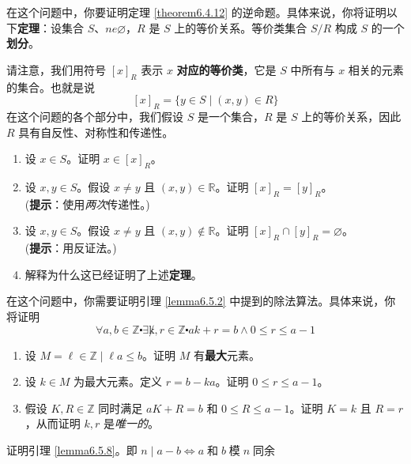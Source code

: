\begin{exercise}
    在这个问题中，你要证明定理 \ref{theorem6.4.12} 的逆命题。具体来说，你将证明以下\textbf{定理}：设集合 $S 、ne \varnothing$，$R$ 是 $S$ 上的等价关系。等价类集合 $S/R$ 构成 $S$ 的一个\textbf{划分}。

    请注意，我们用符号 $[x]_R$ 表示 $x$ \textbf{对应的等价类}，它是 $S$ 中所有与 $x$ 相关的元素的集合。也就是说
    \[[x]_R = \{y \in S \mid (x, y) \in R\}\]
    在这个问题的各个部分中，我们假设 $S$ 是一个集合，$R$ 是 $S$ 上的等价关系，因此 $R$ 具有自反性、对称性和传递性。
    \begin{enumerate}[label=(\alph*)]
        \item 设 $x \in S$。证明 $x \in [x]_R$。
        \item 设 $x, y \in S$。假设 $x \ne y$ 且 $(x, y) \in \mathbb{R}$。证明 $[x]_R = [y]_R$。\\
            (\textbf{提示}：使用\emph{两次}传递性。)
        \item 设 $x, y \in S$。假设 $x \ne y$ 且 $(x, y) \notin \mathbb{R}$。证明 $[x]_R \cap [y]_R = \varnothing$。\\
            (\textbf{提示}：用反证法。)
        \item 解释为什么这已经证明了上述\textbf{定理}。
    \end{enumerate}
\end{exercise}

\begin{exercise}\label{exc:exercises6.7.14}
    在这个问题中，你需要证明引理 \ref{lemma6.5.2} 中提到的除法算法。具体来说，你将证明
    \[\forall a, b \in \mathbb{Z} \centerdot \exists \not k, r \in \mathbb{Z} \centerdot ak + r = b \land 0 \le r \le a-1\]
    \begin{enumerate}
        \item 设 $M = {\ell \in \mathbb{Z} \mid \ell a \le b}$。证明 $M$ 有\textbf{最大}元素。
        \item 设 $k \in M$ 为最大元素。定义 $r = b-ka$。证明 $0 \le r \le a-1$。
        \item 假设 $K,R \in \mathbb{Z}$ 同时满足 $aK + R = b$ 和 $ 0 \le R \le a-1$。证明 $K=k$ 且 $R=r$，从而证明 $k,r$ 是\emph{唯一的}。
    \end{enumerate}
\end{exercise}

\begin{exercise}\label{exc:exercises6.7.15}
    证明引理 \ref{lemma6.5.8}。即 $n \mid a - b \iff a \;\text{和}\; b \;\text{模}\; n \;\text{同余}$
\end{exercise}

